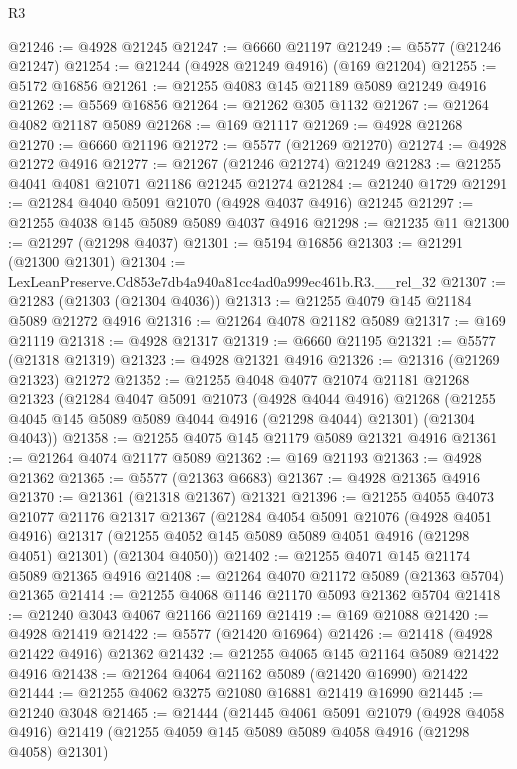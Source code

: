 \begin{lexlean}{R3}
\begin{coremodule}
@21246 := @4928 @21245
@21247 := @6660 @21197
@21249 := @5577 (@21246 @21247)
@21254 := @21244 (@4928 @21249 @4916) (@169 @21204)
@21255 := @5172 @16856
@21261 := @21255 @4083 @145 @21189 @5089 @21249 @4916
@21262 := @5569 @16856
@21264 := @21262 @305 @1132
@21267 := @21264 @4082 @21187 @5089
@21268 := @169 @21117
@21269 := @4928 @21268
@21270 := @6660 @21196
@21272 := @5577 (@21269 @21270)
@21274 := @4928 @21272 @4916
@21277 := @21267 (@21246 @21274) @21249
@21283 := @21255 @4041 @4081 @21071 @21186 @21245 @21274
@21284 := @21240 @1729
@21291 := @21284 @4040 @5091 @21070 (@4928 @4037 @4916) @21245
@21297 := @21255 @4038 @145 @5089 @5089 @4037 @4916
@21298 := @21235 @11
@21300 := @21297 (@21298 @4037)
@21301 := @5194 @16856
@21303 := @21291 (@21300 @21301)
@21304 := LexLeanPreserve.Cd853e7db4a940a81cc4ad0a999ec461b.R3.__rel_32
@21307 := @21283 (@21303 (@21304 @4036))
@21313 := @21255 @4079 @145 @21184 @5089 @21272 @4916
@21316 := @21264 @4078 @21182 @5089
@21317 := @169 @21119
@21318 := @4928 @21317
@21319 := @6660 @21195
@21321 := @5577 (@21318 @21319)
@21323 := @4928 @21321 @4916
@21326 := @21316 (@21269 @21323) @21272
@21352 := @21255
    @4048
    @4077
    @21074
    @21181
    @21268
    @21323
    (@21284
      @4047
      @5091
      @21073
      (@4928 @4044 @4916)
      @21268
      (@21255 @4045 @145 @5089 @5089 @4044 @4916 (@21298 @4044) @21301)
      (@21304 @4043))
@21358 := @21255 @4075 @145 @21179 @5089 @21321 @4916
@21361 := @21264 @4074 @21177 @5089
@21362 := @169 @21193
@21363 := @4928 @21362
@21365 := @5577 (@21363 @6683)
@21367 := @4928 @21365 @4916
@21370 := @21361 (@21318 @21367) @21321
@21396 := @21255
    @4055
    @4073
    @21077
    @21176
    @21317
    @21367
    (@21284
      @4054
      @5091
      @21076
      (@4928 @4051 @4916)
      @21317
      (@21255 @4052 @145 @5089 @5089 @4051 @4916 (@21298 @4051) @21301)
      (@21304 @4050))
@21402 := @21255 @4071 @145 @21174 @5089 @21365 @4916
@21408 := @21264 @4070 @21172 @5089 (@21363 @5704) @21365
@21414 := @21255 @4068 @1146 @21170 @5093 @21362 @5704
@21418 := @21240 @3043 @4067 @21166 @21169
@21419 := @169 @21088
@21420 := @4928 @21419
@21422 := @5577 (@21420 @16964)
@21426 := @21418 (@4928 @21422 @4916) @21362
@21432 := @21255 @4065 @145 @21164 @5089 @21422 @4916
@21438 := @21264 @4064 @21162 @5089 (@21420 @16990) @21422
@21444 := @21255 @4062 @3275 @21080 @16881 @21419 @16990
@21445 := @21240 @3048
@21465 := @21444
    (@21445
      @4061
      @5091
      @21079
      (@4928 @4058 @4916)
      @21419
      (@21255 @4059 @145 @5089 @5089 @4058 @4916 (@21298 @4058) @21301)

\end{coremodule}
\end{lexlean}
